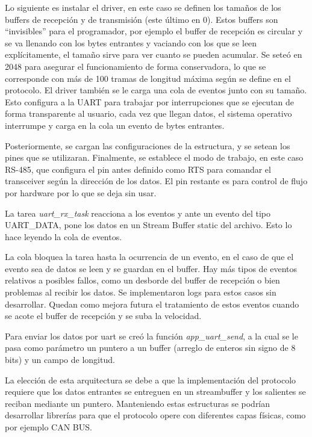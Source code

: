 Lo siguiente es instalar el driver, en este caso se definen los tamaños de los buffers de recepción y de transmisión (este último en 0). Estos buffers son \enquote{invisibles} para el programador, por ejemplo el buffer de recepción es circular y se va llenando con los bytes entrantes y vaciando con los que se leen explícitamente, el tamaño sirve para ver cuanto se pueden acumular. Se seteó en 2048 para asegurar el funcionamiento de forma conservadora, lo que se corresponde con más de 100 tramas de longitud máxima según se define en el protocolo.
El driver también se le carga una cola de eventos junto con su tamaño. Esto configura a la UART para trabajar por interrupciones que se ejecutan de forma transparente al usuario, cada vez que llegan datos, el sistema operativo interrumpe y carga en la cola un evento de bytes entrantes.

Posteriormente, se cargan las configuraciones de la estructura, y se setean los pines que se utilizaran. Finalmente, se establece el modo de trabajo, en este caso RS-485, que configura el pin antes definido como RTS para comandar el transceiver según la dirección de los datos. El pin restante es para control de flujo por hardware por lo que se deja sin usar.

La tarea \textit{uart\_rx\_task} reacciona a  los eventos y ante un evento del tipo UART\_DATA, pone los datos en un Stream Buffer static del archivo. Esto lo hace leyendo la cola de eventos.

La cola bloquea la tarea hasta la ocurrencia de un evento, en el caso de que el evento sea de datos se leen y se guardan en el buffer. Hay más tipos de eventos relativos a posibles fallos, como un desborde del buffer de recepción o bien problemas al recibir los datos. Se implementaron logs para estos casos sin desarrollar. Quedan como mejora futura el tratamiento de estos eventos cuando se acote el buffer de recepción y se suba la velocidad.

Para enviar los datos por uart se creó la función \textit{app\_uart\_send}, a la cual se le pasa como parámetro un puntero a un buffer (arreglo de enteros sin signo de 8 bits) y un campo de longitud.


La elección de esta arquitectura se debe a que la implementación del protocolo requiere que los datos entrantes se entreguen en un streambuffer y los salientes se reciban mediante un puntero. Manteniendo estas estructuras se podrían desarrollar librerías para que el protocolo opere con diferentes capas físicas, como por ejemplo CAN BUS.

